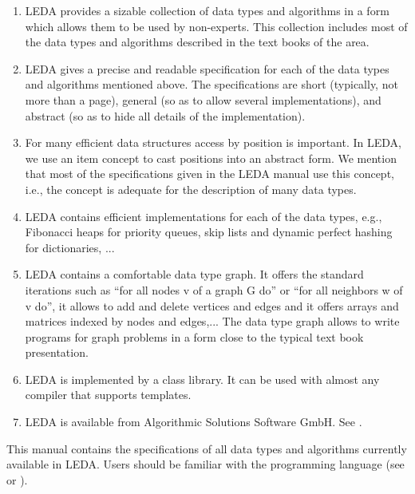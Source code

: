 \begin{enumerate}
\item 
    LEDA provides a sizable collection of data types and algorithms in a form 
    which allows them to be used by non-experts. This
    collection includes most of the data types and algorithms described in the 
    text books of the area. 

\item 
    LEDA gives a precise and readable specification for each of the data types 
    and algorithms mentioned above.  The specifications are short (typically, 
    not more than a page), general (so as to allow several implementations), 
    and abstract (so as to hide all details of the implementation). 

\item
    For many efficient data structures access by position is important. In 
    LEDA, we use an item concept to cast positions into an abstract form. We 
    mention that most of the specifications given in the LEDA manual use this 
    concept, i.e., the concept is adequate for the description of many data 
    types. 

\item
    LEDA contains efficient implementations for each of the data types, e.g., 
    Fibonacci heaps for priority queues, skip lists and dynamic perfect 
    hashing for dictionaries, ...


\item
    LEDA contains a comfortable data type graph. It offers the standard 
    iterations such as ``for all nodes v of a graph G do'' or ``for all 
    neighbors w of v do'', it allows to add and delete vertices and edges 
    and it offers arrays and matrices indexed by nodes and edges,...  
    The data type graph allows to write programs for graph problems in a 
    form close to the typical text book presentation.


\item 
    LEDA is implemented by a \CC{} class library. It can be used with almost
    any \CC{} compiler that supports templates. 


\item
    LEDA is available from Algorithmic Solutions Software GmbH. See 
    . 

\end{enumerate}

This manual contains the specifications of all data types and algorithms 
currently available in LEDA. Users should be familiar with the \CC{}
programming language (see \cite{S91} or \cite{Li89}).  

